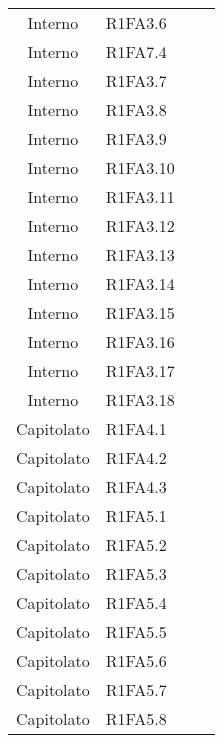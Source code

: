 {\begin{longtable}{ c C{4cm} c c}
Interno & R1FA3.6\\

Interno & R1FA7.4\\

Interno & R1FA3.7\\

Interno & R1FA3.8\\

Interno & R1FA3.9\\

Interno & R1FA3.10\\

Interno & R1FA3.11\\

Interno & R1FA3.12\\

Interno & R1FA3.13\\


Interno & R1FA3.14\\

Interno & R1FA3.15\\

Interno & R1FA3.16\\

Interno & R1FA3.17\\

Interno & R1FA3.18\\

Capitolato & R1FA4.1\\

Capitolato & R1FA4.2\\

Capitolato & R1FA4.3\\

Capitolato & R1FA5.1\\

Capitolato & R1FA5.2\\


Capitolato & R1FA5.3\\

Capitolato & R1FA5.4\\

Capitolato & R1FA5.5\\

Capitolato & R1FA5.6\\

Capitolato & R1FA5.7\\

Capitolato & R1FA5.8\\


\end{longtable}}
